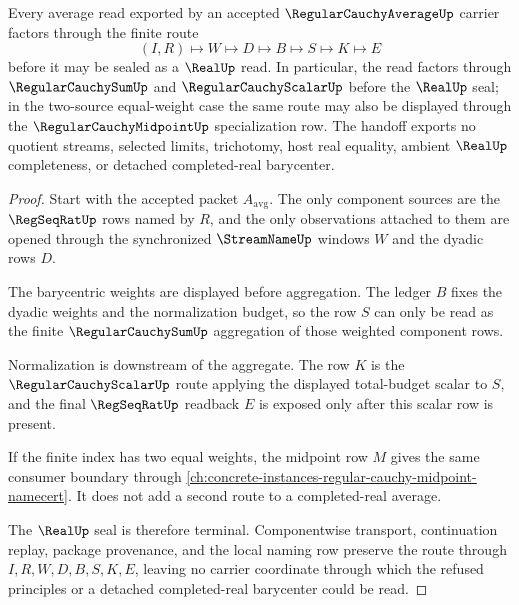 \begin{theorem}
\label{thm:regular-cauchy-average-barycentric-handoff}
Every average read exported by an accepted $\RegularCauchyAverageUp$ carrier factors through the finite route
$$
(I,R)\longmapsto W\longmapsto D\longmapsto B\longmapsto S\longmapsto K\longmapsto E
$$
before it may be sealed as a $\RealUp$ read. In particular, the read factors through $\RegularCauchySumUp$ and $\RegularCauchyScalarUp$ before the $\RealUp$ seal; in the two-source equal-weight case the same route may also be displayed through the $\RegularCauchyMidpointUp$ specialization row. The handoff exports no quotient streams, selected limits, trichotomy, host real equality, ambient $\RealUp$ completeness, or detached completed-real barycenter.
\end{theorem}
\begin{proof}
Start with the accepted packet $A_{\mathrm{avg}}$. The only component sources are the $\RegSeqRatUp$ rows named by $R$, and the only observations attached to them are opened through the synchronized $\StreamNameUp$ windows $W$ and the dyadic rows $D$.

The barycentric weights are displayed before aggregation. The ledger $B$ fixes the dyadic weights and the normalization budget, so the row $S$ can only be read as the finite $\RegularCauchySumUp$ aggregation of those weighted component rows.

Normalization is downstream of the aggregate. The row $K$ is the $\RegularCauchyScalarUp$ route applying the displayed total-budget scalar to $S$, and the final $\RegSeqRatUp$ readback $E$ is exposed only after this scalar row is present.

If the finite index has two equal weights, the midpoint row $M$ gives the same consumer boundary through \autoref{ch:concrete-instances-regular-cauchy-midpoint-namecert}. It does not add a second route to a completed-real average.

The $\RealUp$ seal is therefore terminal. Componentwise transport, continuation replay, package provenance, and the local naming row preserve the route through $I,R,W,D,B,S,K,E$, leaving no carrier coordinate through which the refused principles or a detached completed-real barycenter could be read.
\end{proof}


